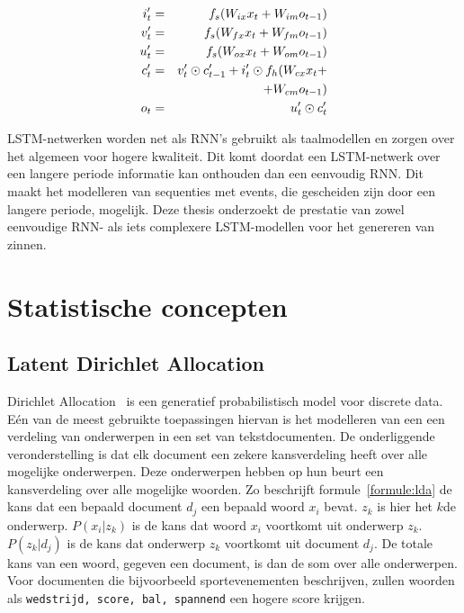 \begin{eqnarray}
\vspace{-3mm}
\label{lstm-memory-start}
i_t' & = & f_s (W_{ix} x_t + W_{im} o_{t-1}) \label{lstm-input} \\
v_t' & = & f_s (W_{fx} x_t + W_{fm} o_{t-1}) \\
u_t' & = & f_s (W_{ox} x_t + W_{om} o_{t-1}) \\
c_t' & = & v_t' \odot c_{t-1}' + i_t' \odot f_h(W_{cx} x_t + \nonumber \\
&   & + W_{cm} o_{t-1}) \\
o_t & = & u_t' \odot c_t'
\label{lstm-memory}
\vspace{-3mm}
\end{eqnarray}

LSTM-netwerken worden net als RNN's gebruikt als taalmodellen en zorgen over het algemeen voor hogere kwaliteit. Dit komt doordat een LSTM-netwerk over een langere periode informatie kan onthouden dan een eenvoudig RNN. Dit maakt het modelleren van sequenties met events, die gescheiden zijn door een langere periode, mogelijk. Deze thesis onderzoekt de prestatie van zowel eenvoudige RNN- als iets complexere LSTM-modellen voor het genereren van zinnen.


\section{Statistische concepten}

\subsection{Latent Dirichlet Allocation}
Dirichlet Allocation~\cite{Blei2012} is een generatief probabilistisch model voor discrete data. E\'en van de meest gebruikte toepassingen hiervan is het modelleren van een een verdeling van onderwerpen in een set van tekstdocumenten. De onderliggende veronderstelling is dat elk document een zekere kansverdeling heeft over alle mogelijke onderwerpen. Deze onderwerpen hebben op hun beurt een kansverdeling over alle mogelijke woorden. Zo beschrijft formule~\eqref{formule:lda} de kans dat een bepaald document $d_j$ een bepaald woord $x_i$ bevat. $z_k$ is hier het $k$de onderwerp. $P(x_i|z_k)$ is de kans dat woord $x_i$ voortkomt uit onderwerp $z_k$. $P(z_k|d_j)$ is de kans dat onderwerp $z_k$ voortkomt uit document $d_j$. De totale kans van een woord, gegeven een document, is dan de som over alle onderwerpen. Voor documenten die bijvoorbeeld sportevenementen beschrijven, zullen woorden als \texttt{wedstrijd, score, bal, spannend} een hogere score krijgen.

